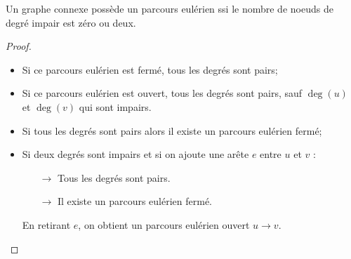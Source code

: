 \begin{mytheo} 
  Un graphe connexe possède un parcours eulérien ssi le nombre de noeuds de degré impair est zéro ou deux.
  \begin{proof}
    \noindent
    \newline
    \fbox{$\Longrightarrow$}
    \newline
    \begin{itemize}
      \item Si ce parcours eulérien est fermé, tous les degrés sont pairs;
      \item Si ce parcours eulérien est ouvert, tous les degrés sont pairs, sauf $\deg(u)$ et $\deg(v)$ qui sont impairs.
    \end{itemize}

    \noindent
    \fbox{$\Longleftarrow$}
    \newline
    \begin{itemize}
      \item Si tous les degrés sont pairs alors il existe un parcours eulérien fermé;
      \item Si deux degrés sont impairs et si on ajoute une arête $e$ entre $u$ et $v$ :
        \begin{itemize}
          \item[$\rightarrow$] Tous les degrés sont pairs.
          \item[$\rightarrow$] Il existe un parcours eulérien fermé.
        \end{itemize}
        En retirant $e$, on obtient un parcours eulérien ouvert $u \rightarrow v$.
    \end{itemize}
  \end{proof}
\end{mytheo}

